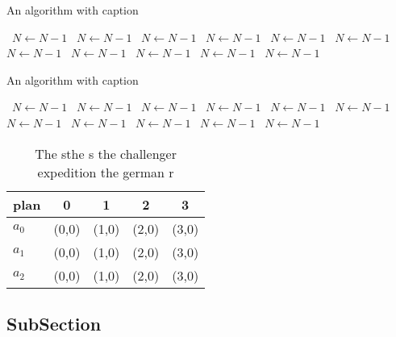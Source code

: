 \documentclass[a4paper]{article}
\begin{document}
\begin{algorithm}
\caption{An algorithm with caption}
\begin{algorithmic}
\    \State $N \gets N - 1$
\    \State $N \gets N - 1$
\    \State $N \gets N - 1$
\    \State $N \gets N - 1$
\    \State $N \gets N - 1$
\    \State $N \gets N - 1$
\    \State $N \gets N - 1$
\    \State $N \gets N - 1$
\    \State $N \gets N - 1$
\    \State $N \gets N - 1$
\    \State $N \gets N - 1$
\EndWhile
\end{algorithmic}
\end{algorithm}

\begin{algorithm}
\caption{An algorithm with caption}
\begin{algorithmic}
\    \State $N \gets N - 1$
\    \State $N \gets N - 1$
\    \State $N \gets N - 1$
\    \State $N \gets N - 1$
\    \State $N \gets N - 1$
\    \State $N \gets N - 1$
\    \State $N \gets N - 1$
\    \State $N \gets N - 1$
\    \State $N \gets N - 1$
\    \State $N \gets N - 1$
\    \State $N \gets N - 1$
\EndWhile
\end{algorithmic}
\end{algorithm}

\begin{table}
\begin{adjustbox}{width=0.6\columnwidth}
\begin{tabular}{|l|l|l|l|l|}
\hline
\textbf{plan} & \multicolumn{1}{c|}{\textbf{0}} & \multicolumn{1}{c|}{\textbf{1}} & \multicolumn{1}{c|}{\textbf{2}} & \multicolumn{1}{c|}{\textbf{3}} \\ \hline
\textbf{$a_0$}  & (0,0) & (1,0) & (2,0) & (3,0) \\ \hline
\textbf{$a_1$}  & (0,0) & (1,0) & (2,0) & (3,0) \\ \hline
\textbf{$a_2$}  & (0,0) & (1,0) & (2,0) & (3,0) \\ \hline
\end{tabular}
\end{adjustbox}
\caption{The sthe s the challenger expedition the german r
}
\end{table}

\subsection{SubSection}
\end{document}
